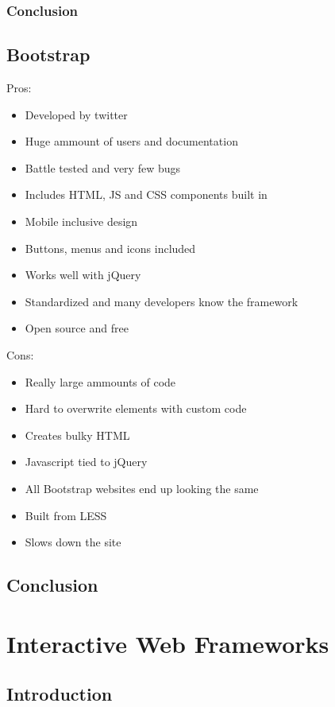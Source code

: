 \documentclass[draftclsnofoot,onecolumn,letterpaper,10pt,compsoc]{IEEEtran}
\begin{document}
    \subsubsection{Conclusion}

	\subsection{Bootstrap}

  Pros:
  \begin{itemize}
    \item Developed by twitter
    \item Huge ammount of users and documentation
    \item Battle tested and very few bugs
    \item Includes HTML, JS and CSS components built in
    \item Mobile inclusive design
    \item Buttons, menus and icons included
    \item Works well with jQuery
    \item Standardized and many developers know the framework
    \item Open source and free
  \end{itemize}

  Cons:
  \begin{itemize}
    \item Really large ammounts of code
    \item Hard to overwrite elements with custom code
    \item Creates bulky HTML
    \item Javascript tied to jQuery
    \item All Bootstrap websites end up looking the same
    \item Built from LESS
    \item Slows down the site
  \end{itemize}

  \subsection{Conclusion}

\section{Interactive Web Frameworks}
  \subsection{Introduction}
\end{document}
